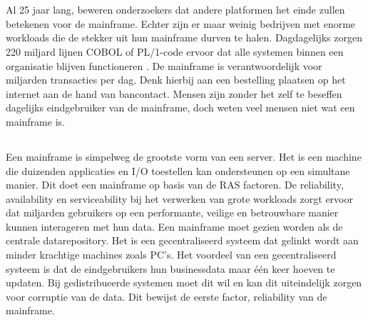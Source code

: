 
\chapter{}
\label{ch:inleiding}
Al 25 jaar lang, beweren onderzoekers dat andere platformen het einde zullen betekenen voor de mainframe. Echter zijn er maar weinig bedrijven met enorme workloads die de stekker uit hun mainframe durven te halen. Dagdagelijks zorgen 220 miljard lijnen COBOL of PL/1-code ervoor dat alle systemen binnen een organisatie blijven functioneren \autocite{Scannell2017}. De mainframe is verantwoordelijk voor miljarden transacties per dag. Denk hierbij aan een bestelling plaatsen op het internet aan de hand van bancontact. Mensen zijn zonder het zelf te beseffen dagelijks eindgebruiker van de mainframe, doch weten veel mensen niet wat een mainframe is. 

\section{}
Een mainframe is simpelweg de grootste vorm van een server. Het is een machine die duizenden applicaties en I/O toestellen kan ondersteunen op een simultane manier. Dit doet een mainframe op basis van de RAS factoren. De reliability, availability en serviceability bij het verwerken van grote workloads zorgt ervoor dat miljarden gebruikers op een performante, veilige en betrouwbare manier kunnen interageren met hun data. Een mainframe moet gezien worden als de centrale datarepository. Het is een gecentraliseerd systeem dat gelinkt wordt aan minder krachtige machines zoals PC's.  Het voordeel van een gecentraliseerd systeem is dat de eindgebruikers hun businessdata maar één keer hoeven te updaten. Bij gedistribueerde systemen moet dit wil en kan dit uiteindelijk zorgen voor corruptie van de data. Dit bewijst de eerste factor, reliability van de mainframe. 

